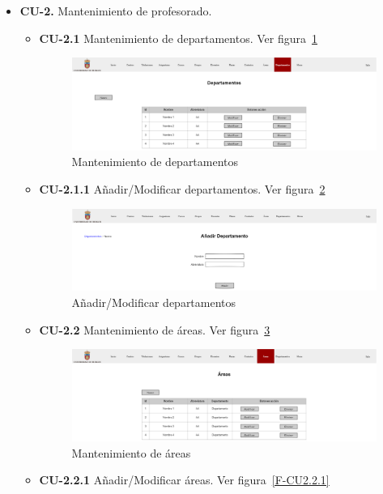 \begin{itemize}
\newpage	
	\item \textbf{CU-2.} Mantenimiento de profesorado.
	\begin{itemize}
		\item \textbf{CU-2.1} Mantenimiento de departamentos. Ver figura~\ref{F-CU2.1}
		\begin{figure}[!h]
		\centering
		\includegraphics[width=\textwidth]{../img/Anexos/Vistas/departamentos.png}
		\caption{Mantenimiento de departamentos}\label{F-CU2.1}
		\end{figure}
		\FloatBarrier
		\item \textbf{CU-2.1.1} Añadir/Modificar departamentos. Ver figura~\ref{F-CU2.1.1}
		\begin{figure}[!h]
		\centering
		\includegraphics[width=\textwidth]{../img/Anexos/Vistas/add_departamento.png}
		\caption{Añadir/Modificar departamentos}\label{F-CU2.1.1}
		\end{figure}
		\FloatBarrier
\newpage
		\item \textbf{CU-2.2} Mantenimiento de áreas. Ver figura~\ref{F-CU2.2}
		\begin{figure}[!h]
		\centering
		\includegraphics[width=\textwidth]{../img/Anexos/Vistas/areas.png}
		\caption{Mantenimiento de áreas}\label{F-CU2.2}
		\end{figure}
		\FloatBarrier
		\item \textbf{CU-2.2.1} Añadir/Modificar áreas. Ver figura~\ref{F-CU2.2.1}

\end{itemize}
\end{itemize}
